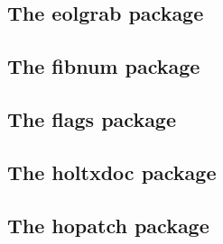 \documentclass[a4paper,12pt]{article}
\makeatletter
\newcommand*{\xpackage}[1]{\textsf{#1}}
\newcommand*{\tocinclude}[1]{%
  \setcounter{tocdepth}{3}%
  \begingroup
    \makeatletter
    \def\@prj{#1}%
    \let\contentsline\foreign@contentsline
  \endgroup
}
\def\foreign@contentsline#1#2#3#4{%
  \ifx\\#4\\%
    \csname l@#1\endcsname{#2}{#3}%
  \else
    \ifHy@linktocpage
      \csname l@#1\endcsname{{#2}}{%
        \hyper@linkfile{#3}{\@prj.pdf}{#4}%
      }%
    \else
      \csname l@#1\endcsname{%
        \hyper@linkfile{#2}{\@prj.pdf}{#4}%
      }{#3}%
    \fi
  \fi
}%
\newcommand*{\pkgsectformat}[1]{%
  \texorpdfstring{%
    \textcolor{link}{The} %
    \xpackage{#1} %
    \textcolor{link}{package}%
  }{#1}%
}
\makeatother
\begin{document}
\newpage
\subsection{\pkgsectformat{eolgrab}}
\label{eolgrab}
\begin{abstract}
This package implements a generic argument grabber
to catch an argument that is delimited by the line end.
\end{abstract}
\tocinclude{eolgrab}

\newpage
\subsection{\pkgsectformat{fibnum}}
\label{fibnum}
\begin{abstract}
The package \xpackage{fibnum} provides expandable fibonacci
numbers for both  and .
\end{abstract}
\tocinclude{fibnum}

\newpage
\subsection{\pkgsectformat{flags}}
\label{flags}
\begin{abstract}
Package \xpackage{flags} allows the setting and clearing
of flags in bit fields and converts the bit field into a
decimal number. Currently the bit field is limited to 31 bits.
\end{abstract}
\tocinclude{flags}

\newpage
\subsection{\pkgsectformat{holtxdoc}}
\label{holtxdoc}
\begin{abstract}
The package is used for the documentation of my packages in
DTX format. It contains some private macros and setup for
my needs. Thus do not use it. I have separated the part
that may be useful for others in package \xpackage{hypdoc}.
\end{abstract}
\tocinclude{holtxdoc}

\newpage
\subsection{\pkgsectformat{hopatch}}
\label{hopatch}
\begin{abstract}
This packages provides a wrapper to various package hooks
provided by other packages or classes, but does not define
own hooks.
\end{abstract}
\tocinclude{hopatch}
\end{document}
